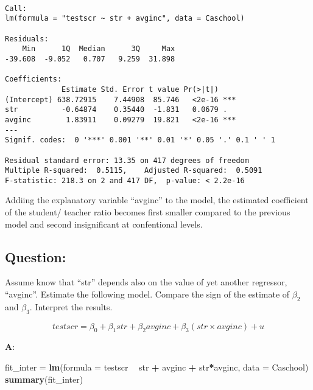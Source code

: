 \documentclass[12pt,]{article}
\newenvironment{Shaded}{\begin{snugshade}}{\end{snugshade}}
\newcommand{\DataTypeTok}[1]{\textcolor[rgb]{0.13,0.29,0.53}{#1}}
\newcommand{\KeywordTok}[1]{\textcolor[rgb]{0.13,0.29,0.53}{\textbf{#1}}}
\newcommand{\NormalTok}[1]{#1}
\newcommand{\OperatorTok}[1]{\textcolor[rgb]{0.81,0.36,0.00}{\textbf{#1}}}
\newcommand{\StringTok}[1]{\textcolor[rgb]{0.31,0.60,0.02}{#1}}
\begin{document}
\begin{verbatim}

Call:
lm(formula = "testscr ~ str + avginc", data = Caschool)

Residuals:
    Min      1Q  Median      3Q     Max 
-39.608  -9.052   0.707   9.259  31.898 

Coefficients:
             Estimate Std. Error t value Pr(>|t|)    
(Intercept) 638.72915    7.44908  85.746   <2e-16 ***
str          -0.64874    0.35440  -1.831   0.0679 .  
avginc        1.83911    0.09279  19.821   <2e-16 ***
---
Signif. codes:  0 '***' 0.001 '**' 0.01 '*' 0.05 '.' 0.1 ' ' 1

Residual standard error: 13.35 on 417 degrees of freedom
Multiple R-squared:  0.5115,    Adjusted R-squared:  0.5091 
F-statistic: 218.3 on 2 and 417 DF,  p-value: < 2.2e-16
\end{verbatim}

Addiing the explanatory variable ``avginc'' to the model, the estimated
coefficient of the student/ teacher ratio becomes first smaller compared
to the previous model and second insignificant at confentional levels.

\hypertarget{question-12}{%
\subsection{Question:}\label{question-12}}

Assume know that ``str'' depends also on the value of yet another
regressor, ``avginc''. Estimate the following model. Compare the sign of
the estimate of \(\beta_2\) and \(\beta_3\). Interpret the results.

\begin{equation}
testscr = \beta_0 +  \beta_1  str +   \beta_2  avginc + \beta_3 (str \times avginc)  + u
\end{equation}

\textbf{A}:

\begin{Shaded}
\begin{Highlighting}[]
\NormalTok{fit_inter =}\StringTok{ }\KeywordTok{lm}\NormalTok{(}\DataTypeTok{formula =}\NormalTok{ testscr }\OperatorTok{~}\StringTok{ }\NormalTok{str }\OperatorTok{+}\StringTok{ }\NormalTok{avginc }\OperatorTok{+}\StringTok{ }\NormalTok{str}\OperatorTok{*}\NormalTok{avginc, }\DataTypeTok{data =}\NormalTok{ Caschool)}
\KeywordTok{summary}\NormalTok{(fit_inter)}
\end{Highlighting}
\end{Shaded}
\end{document}
